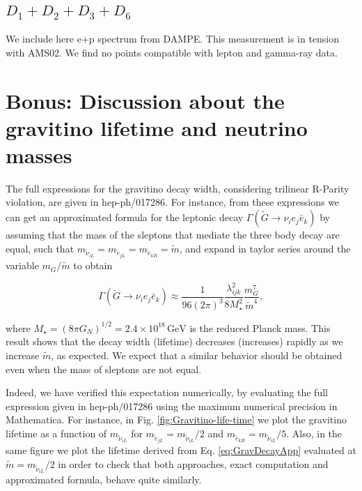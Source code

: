 \documentclass[a4paper,11pt]{article}
\begin{document}
\subsection{$D_1 + D_2 + D_3 + D_6$}
We include here e+p spectrum from DAMPE. This measurement is in tension with AMS02. We find no points compatible with lepton and gamma-ray data.



\section{Bonus: Discussion about the gravitino lifetime and neutrino masses}
\label{sec:lifetime-neutrinomasses}

The full expressions for the gravitino decay width, considering trilinear
R-Parity violation, are given in hep-ph/017286. For instance, from
these expressions we can get an approximated formula for the leptonic
decay $\Gamma(\tilde{G}\rightarrow\nu_{i}e_{j}\bar{e}_{k})$ by assuming
that the mass of the sleptons that mediate the three body decay are
equal, such that $m_{\tilde{\nu}_{iL}}=m_{\tilde{e}_{jL}}=m_{\tilde{e}_{kR}}=\tilde{m}$,
and expand in taylor series around the variable $m_{G}/\tilde{m}$
to obtain

\begin{equation}
\Gamma(\tilde{G}\rightarrow\nu_{i}e_{j}\bar{e}_{k})\approx\frac{1}{96(2\pi)^{3}}\frac{\lambda_{ijk}^{2}}{8M_{\star}^{2}}\frac{m_{G}^{7}}{\tilde{m}^{4}},\label{eq:GravDecayApp}
\end{equation}


\noindent where $M_{\star}=(8\pi G_{N})^{1/2}=2.4\times10^{18}\,\mbox{GeV}$
is the reduced Planck mass. This result shows that the decay width
(lifetime) decreases (increases) rapidly as we increase $\tilde{m}$,
as expected. We expect that a similar behavior should be obtained
even when the mass of sleptons are not equal.

Indeed, we have verified this expectation numerically, by evaluating
the full expression given in hep-ph/017286 using the maximum numerical
precision in Mathematica. For instance, in Fig. \ref{fig:Gravitino-life-time}
we plot the gravitino lifetime as a function of $m_{\tilde{\nu}_{iL}}$
for $m_{\tilde{e}_{jL}}=m_{\tilde{\nu}_{iL}}/2$ and $m_{\tilde{e}_{kR}}=m_{\tilde{\nu}_{iL}}/5$.
Also, in the same figure we plot the lifetime derived from Eq. \ref{eq:GravDecayApp}
evaluated at $\tilde{m}=m_{\tilde{\nu}_{iL}}/2$ in order to check
that both approaches, exact computation and approximated formula,
behave quite similarly.
\end{document}
